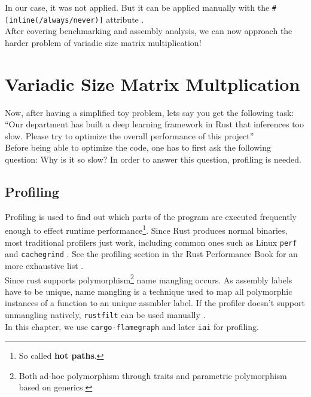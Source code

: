 In our case, it was not applied. But it can be applied manually with the \texttt{\#[inline(/always/never)]} attribute \cite{inline}.\\

After covering benchmarking and assembly analysis, we can now approach the harder problem of variadic size matrix multiplication!

\section{Variadic Size Matrix Multplication}

Now, after having a simplified toy problem, lets say you get the following task:\\

``Our department has built a deep learning framework in Rust that inferences too slow. Please try to optimize the overall performance of this project''\\

Before being able to optimize the code, one has to first ask the following question: Why is it so slow? In order to answer this question, profiling is needed.

\subsection{Profiling}

Profiling is used to find out which parts of the program are executed frequently enough to effect runtime performance\footnote{So called \textbf{hot paths}.}. Since Rust produces normal binaries, most traditional profilers just work, including common ones such as Linux \texttt{perf} \cite{perf} and \texttt{cachegrind} \cite{cachegrind}. See the profiling section in thr Rust Performance Book for an more exhaustive list \cite{profiling}.\\

Since rust supports polymorphism\footnote{Both ad-hoc polymorphism through traits and parametric polymorphism based on generics.} name mangling occurs. As assembly labels have to be unique, name mangling is a technique used to map all polymorphic instances of a function to an unique assmbler label. If the profiler doesn't support unmangling natively, \texttt{rustfilt} can be used manually \cite{rustfilt}.\\

In this chapter, we use \texttt{cargo-flamegraph} \cite{flamegraph} and later \texttt{iai} \cite{iai} for profiling.

